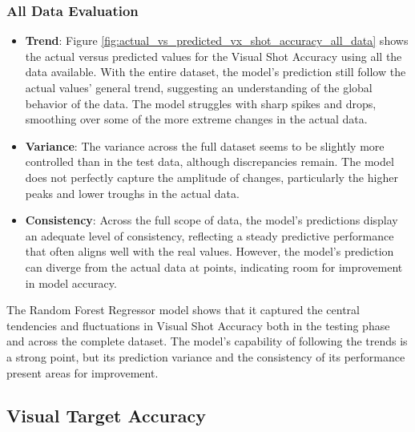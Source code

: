 \subsubsection*{All Data Evaluation}

\begin{itemize}
    \item \textbf{Trend}: Figure \ref{fig:actual_vs_predicted_vx_shot_accuracy_all_data} shows the actual versus predicted values for the Visual Shot Accuracy using all the data available.
          With the entire dataset, the model's prediction still follow the actual values' general trend, suggesting an understanding of the global behavior of the data. The model struggles
          with sharp spikes and drops, smoothing over some of the more extreme changes in the actual data.

    \item \textbf{Variance}: The variance across the full dataset seems to be slightly more controlled than in the test data, although discrepancies remain. The model does not perfectly capture
          the amplitude of changes, particularly the higher peaks and lower troughs in the actual data.

    \item \textbf{Consistency}: Across the full scope of data, the model's predictions display an adequate level of consistency, reflecting a steady predictive performance that often aligns well with the real values.
          However, the model's prediction can diverge from the actual data at points, indicating room for improvement in model accuracy.

\end{itemize}

The Random Forest Regressor model shows that it captured the central tendencies and fluctuations in Visual Shot Accuracy both in the testing phase and across the complete dataset. The model's capability of
following the trends is a strong point, but its prediction variance and the consistency of its performance present areas for improvement.


\subsection*{Visual Target Accuracy}

